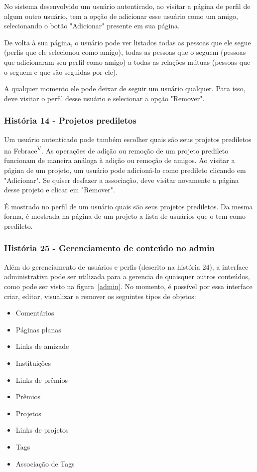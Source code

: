       No sistema desenvolvido um usuário autenticado, ao visitar a página de perfil de algum outro usuário, tem a opção de adicionar esse usuário como um amigo, selecionando o botão "Adicionar" presente em sua página.

      De volta à sua página, o usuário pode ver listados todas as pessoas que ele segue (perfis que ele selecionou como amigo), todas as pessoas que o seguem (pessoas que adicionaram seu perfil como amigo) a todas as relações mútuas (pessoas que o seguem e que são seguidas por ele).

      A qualquer momento ele pode deixar de seguir um usuário qualquer. Para isso, deve visitar o perfil desse usuário e selecionar a opção "Remover".

    \subsubsection{História 14 - Projetos prediletos}
      Um usuário autenticado pode também escolher quais são seus projetos prediletos na Febrace\textsuperscript{V}. As operações de adição ou remoção de um projeto predileto funcionam de maneira análoga à adição ou remoção de amigos. Ao visitar a página de um projeto, um usuário pode adicioná-lo como predileto clicando em "Adicionar". Se quiser desfazer a associação, deve visitar novamente a página desse projeto e clicar em "Remover".

      É mostrado no perfil de um usuário quais são seus projetos prediletos. Da mesma forma, é mostrada na página de um projeto a lista de usuários que o tem como predileto.

    \subsubsection{História 25 - Gerenciamento de conteúdo no admin}
      Além do gerenciamento de usuários e perfis (descrito na história 24), a interface administrativa pode ser utilizada para a gerencia de quaisquer outros conteúdos, como pode ser visto na figura~\ref{admin}. No momento, é possível por essa interface criar, editar, visualizar e remover os seguintes tipos de objetos:

      \begin{multicols}{3}
      \begin{itemize}
        \item{Comentários}
        \item{Páginas planas}
        \item{Links de amizade}
        \item{Instituições}
        \item{Links de prêmios}
        \item{Prêmios}
        \item{Projetos}
        \item{Links de projetos}
        \item{Tags}
        \item{Associação de Tags}
      \end{itemize}
      \end{multicols}


